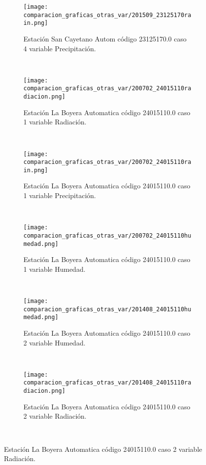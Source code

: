 \begin{figure}[H]
\centering
\begin{subfigure}[normla]{0.4\textwidth}
\caption{Estación San Cayetano Autom  código 23125170.0 caso 4 variable Precipitación.}
\texttt{[image: comparacion\_graficas\_otras\_var/201509\_23125170rain.png]}
\end{subfigure}
~
\begin{subfigure}[normla]{0.4\textwidth}
\caption{Estación La Boyera Automatica código 24015110.0 caso 1 variable Radiación.}
\texttt{[image: comparacion\_graficas\_otras\_var/200702\_24015110radiacion.png]}
\end{subfigure}
~
\begin{subfigure}[normla]{0.4\textwidth}
\caption{Estación La Boyera Automatica código 24015110.0 caso 1 variable Precipitación.}
\texttt{[image: comparacion\_graficas\_otras\_var/200702\_24015110rain.png]}
\end{subfigure}
~
\begin{subfigure}[normla]{0.4\textwidth}
\caption{Estación La Boyera Automatica código 24015110.0 caso 1 variable Humedad.}
\texttt{[image: comparacion\_graficas\_otras\_var/200702\_24015110humedad.png]}
\end{subfigure}
~
\begin{subfigure}[normla]{0.4\textwidth}
\caption{Estación La Boyera Automatica código 24015110.0 caso 2 variable Humedad.}
\texttt{[image: comparacion\_graficas\_otras\_var/201408\_24015110humedad.png]}
\end{subfigure}
~
\begin{subfigure}[normla]{0.4\textwidth}
\caption{Estación La Boyera Automatica código 24015110.0 caso 2 variable Radiación.}
\texttt{[image: comparacion\_graficas\_otras\_var/201408\_24015110radiacion.png]}
\end{subfigure}
~
\end{figure}
           
